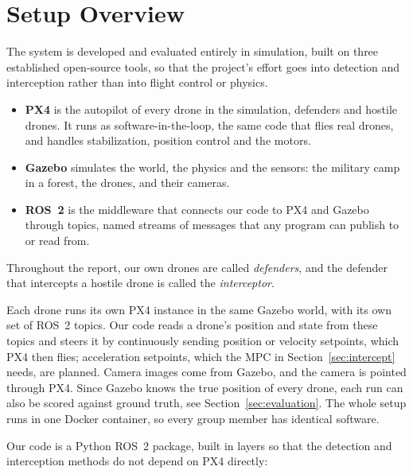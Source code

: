 \section{Setup Overview} \label{setup_overview}
The system is developed and evaluated entirely in simulation, built on three
established open-source tools, so that the project's effort goes into
detection and interception rather than into flight control or physics.

\begin{itemize}
    \item \textbf{PX4} \cite{meier2015px4}
          is the autopilot of every drone in the simulation,
          defenders and hostile drones. It runs as software-in-the-loop,
          the same code that flies real drones, and handles stabilization,
          position control and the motors.
    \item \textbf{Gazebo} \cite{koenig2004gazebo} 
          simulates the world, the
          physics and the sensors: the military camp in a forest, the drones,
          and their cameras.
    \item \textbf{ROS~2} \cite{macenski2022ros2} 
          is the middleware that
          connects our code to PX4 and Gazebo through topics, named streams
          of messages that any program can publish to or read from.
\end{itemize}

Throughout the report, our own drones are called \emph{defenders}, and the
defender that intercepts a hostile drone is called the \emph{interceptor}.

Each drone runs its own PX4 instance in the same Gazebo world, with its own
set of ROS~2 topics. Our code reads a drone's position and state from these topics and steers it by continuously sending position or velocity setpoints, which PX4 then
flies; acceleration setpoints, which the MPC in Section~\ref{sec:intercept} needs, are planned. Camera images come from Gazebo, and the camera is pointed through PX4. Since Gazebo knows the true position of every drone, each run can also be scored against ground truth, see Section~\ref{sec:evaluation}. The whole setup runs in one Docker container, so every group member has identical software.

Our code is a Python ROS~2 package, built in layers so that the detection
and interception methods do not depend on PX4 directly:

